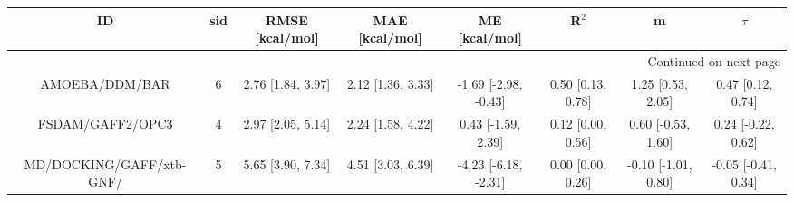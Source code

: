 \documentclass[8pt]{article}
\begin{document}
\begin{center}
\begin{footnotesize}
\begin{longtable}{|cccccccc|}
\toprule
                       ID & sid &    RMSE [kcal/mol] &     MAE [kcal/mol] &         ME [kcal/mol] &              R$^2$ &                    m &               $\tau$ \\
\midrule
\endhead
\midrule
\multicolumn{8}{r}{{Continued on next page}} \\
\midrule
\endfoot

\bottomrule
\endlastfoot
           AMOEBA/DDM/BAR &   6 &  2.76 [1.84, 3.97] &  2.12 [1.36, 3.33] &  -1.69 [-2.98, -0.43] &  0.50 [0.13, 0.78] &    1.25 [0.53, 2.05] &    0.47 [0.12, 0.74] \\
         FSDAM/GAFF2/OPC3 &   4 &  2.97 [2.05, 5.14] &  2.24 [1.58, 4.22] &    0.43 [-1.59, 2.39] &  0.12 [0.00, 0.56] &   0.60 [-0.53, 1.60] &   0.24 [-0.22, 0.62] \\
 MD/DOCKING/GAFF/xtb-GNF/ &   5 &  5.65 [3.90, 7.34] &  4.51 [3.03, 6.39] &  -4.23 [-6.18, -2.31] &  0.00 [0.00, 0.26] &  -0.10 [-1.01, 0.80] &  -0.05 [-0.41, 0.34] \\
\end{longtable}
\end{footnotesize}
\end{center}
\end{document}
